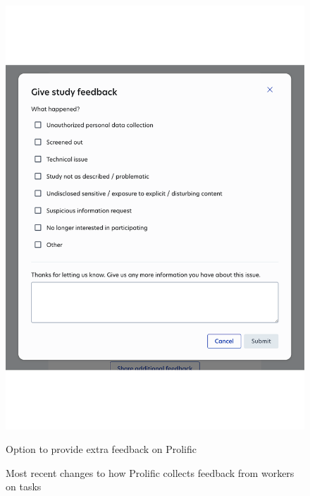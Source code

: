 \begin{figure}[htbp]
\begin{minipage}{0.48\textwidth}
        \includegraphics[width=\textwidth]{figures/prolific_feedback_extra.pdf}
        \caption{Option to provide extra feedback on Prolific}
        \label{fig:right}
    \end{minipage}
    \caption{Most recent changes to how Prolific collects feedback from workers on tasks}
    \label{fig:prolific-feedback}
\end{figure}

